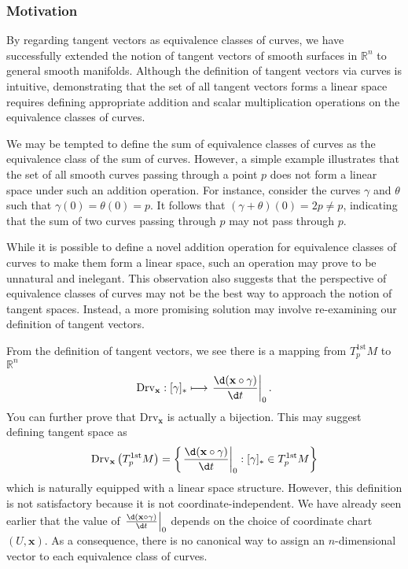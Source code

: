 \documentclass{report}
\begin{document}
\subsubsection{Motivation}
By regarding tangent vectors as equivalence classes of curves, we have successfully extended the notion of tangent vectors of smooth surfaces in $\mathbb{R}^n$ to general smooth manifolds. Although the definition of tangent vectors via curves is intuitive, demonstrating that the set of all tangent vectors forms a linear space requires defining appropriate addition and scalar multiplication operations on the equivalence classes of curves. 

We may be tempted to define the sum of equivalence classes of curves as the equivalence class of the sum of curves. However, a simple example illustrates that the set of all smooth curves passing through a point $p$ does not form a linear space under such an addition operation. For instance, consider the curves $\gamma$ and $\theta$ such that $\gamma(0)=\theta(0)=p$. It follows that $(\gamma+\theta)(0)=2p\neq p$, indicating that the sum of two curves passing through $p$ may not pass through $p$.

While it is possible to define a novel addition operation for equivalence classes of curves to make them form a linear space, such an operation may prove to be unnatural and inelegant. This observation also suggests that the perspective of equivalence classes of curves may not be the best way to approach the notion of tangent spaces. Instead, a more promising solution may involve re-examining our definition of tangent vectors.

From the definition of tangent vectors, we see there is a mapping from $T_p^{1\mathrm{st}}M$ to $\mathbb{R}^n$
\[
    \mathrm{Drv}_{\mathbf{x}}:[\gamma]_*\longmapsto\left.\frac{\d(\mathbf{x} \circ \gamma)}{\d t}\right|_0.
\]
You can further prove that $\mathrm{Drv}_{\mathbf{x}}$ is actually a bijection. This may suggest defining tangent space as
\[
    \mathrm{Drv}_{\mathbf{x}}\left(T_p^{1\mathrm{st}}M\right)=\left\{\left.\frac{\d(\mathbf{x} \circ \gamma)}{\d t}\right|_0: [\gamma]_*\in T_p^{1\mathrm{st}}M \right\}
\]
which is naturally equipped with a linear space structure. However, this definition is not satisfactory because it is not coordinate-independent. We have already seen earlier that the value of $\left.\frac{\d(\mathbf{x} \circ \gamma)}{\d t}\right|_0$ depends on the choice of coordinate chart $(U,\mathbf{x})$. As a consequence,  there is no canonical way to assign an $n$-dimensional vector to each equivalence class of curves. 
\end{document}
